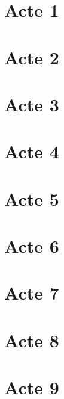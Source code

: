 \chapter{Acte 1}


\chapter{Acte 2}


\chapter{Acte 3}


\chapter{Acte 4}


\chapter{Acte 5}


\chapter{Acte 6}




\chapter{Acte 7}


\chapter{Acte 8}


\chapter{Acte 9}













